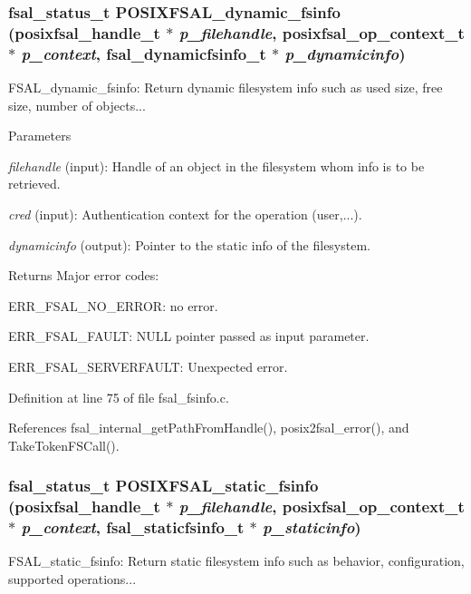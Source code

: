 \subsubsection[{POSIXFSAL\_\-dynamic\_\-fsinfo}]{\setlength{\rightskip}{0pt plus 5cm}fsal\_\-status\_\-t POSIXFSAL\_\-dynamic\_\-fsinfo (posixfsal\_\-handle\_\-t $\ast$ {\em p\_\-filehandle}, \/  posixfsal\_\-op\_\-context\_\-t $\ast$ {\em p\_\-context}, \/  fsal\_\-dynamicfsinfo\_\-t $\ast$ {\em p\_\-dynamicinfo})}\label{fsal__fsinfo_8c_a1dec437e29e4ca7b143e039e7ece652a}
FSAL\_\-dynamic\_\-fsinfo: Return dynamic filesystem info such as used size, free size, number of objects...


\begin{DoxyParams}{Parameters}
\item[{\em filehandle}](input): Handle of an object in the filesystem whom info is to be retrieved. \item[{\em cred}](input): Authentication context for the operation (user,...). \item[{\em dynamicinfo}](output): Pointer to the static info of the filesystem.\end{DoxyParams}
\begin{DoxyReturn}{Returns}
Major error codes:
\begin{DoxyItemize}
\item ERR\_\-FSAL\_\-NO\_\-ERROR: no error.
\item ERR\_\-FSAL\_\-FAULT: NULL pointer passed as input parameter.
\item ERR\_\-FSAL\_\-SERVERFAULT: Unexpected error. 
\end{DoxyItemize}
\end{DoxyReturn}


Definition at line 75 of file fsal\_\-fsinfo.c.

References fsal\_\-internal\_\-getPathFromHandle(), posix2fsal\_\-error(), and TakeTokenFSCall().
\subsubsection[{POSIXFSAL\_\-static\_\-fsinfo}]{\setlength{\rightskip}{0pt plus 5cm}fsal\_\-status\_\-t POSIXFSAL\_\-static\_\-fsinfo (posixfsal\_\-handle\_\-t $\ast$ {\em p\_\-filehandle}, \/  posixfsal\_\-op\_\-context\_\-t $\ast$ {\em p\_\-context}, \/  fsal\_\-staticfsinfo\_\-t $\ast$ {\em p\_\-staticinfo})}\label{fsal__fsinfo_8c_a3ec3f617fa00433892108c8af011097f}
FSAL\_\-static\_\-fsinfo: Return static filesystem info such as behavior, configuration, supported operations...


